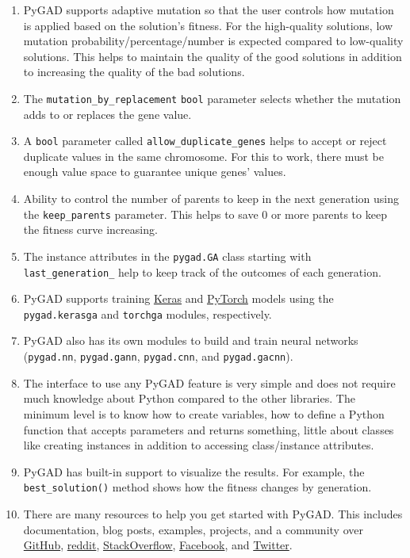 \documentclass[conference]{IEEEtran}
\begin{document}
\begin{enumerate}
  \item PyGAD supports adaptive mutation so that the user controls how mutation is applied based on the solution's fitness. For the high-quality solutions, low mutation probability/percentage/number is expected compared to low-quality solutions. This helps to maintain the quality of the good solutions in addition to increasing the quality of the bad solutions.
  \item The \texttt{mutation\_by\_replacement} \texttt{bool} parameter selects whether the mutation adds to or replaces the gene value.
  \item A \texttt{bool} parameter called \texttt{allow\_duplicate\_genes} helps to accept or reject duplicate values in the same chromosome. For this to work, there must be enough value space to guarantee unique genes' values.
  \item Ability to control the number of parents to keep in the next generation using the \texttt{keep\_parents} parameter. This helps to save 0 or more parents to keep the fitness curve increasing.
  \item The instance attributes in the \texttt{pygad.GA} class starting with \texttt{last\_generation\_} help to keep track of the outcomes of each generation.
  \item PyGAD supports training \href{https://keras.io}{Keras} and \href{https://pytorch.org}{PyTorch} models using the \texttt{pygad.kerasga} and \texttt{torchga} modules, respectively.
  \item PyGAD also has its own modules to build and train neural networks (\texttt{pygad.nn}, \texttt{pygad.gann}, \texttt{pygad.cnn}, and \texttt{pygad.gacnn}).
  \item The interface to use any PyGAD feature is very simple and does not require much knowledge about Python compared to the other libraries. The minimum level is to know how to create variables, how to define a Python function that accepts parameters and returns something, little about classes like creating instances in addition to accessing class/instance attributes.
  \item PyGAD has built-in support to visualize the results. For example, the \texttt{best\_solution()} method shows how the fitness changes by generation.
  \item There are many resources to help you get started with PyGAD. This includes documentation, blog posts, examples, projects, and a community over \href{https://github.com/ahmedfgad/GeneticAlgorithmPython}{GitHub}, \href{https://www.reddit.com/search/?q=PyGAD&sort=relevance}{reddit}, \href{https://stackoverflow.com/search?q=PyGAD}{StackOverflow},  \href{https://www.facebook.com/pygad}{Facebook}, and \href{https://twitter.com/PyGADLib}{Twitter}.
\end{enumerate}
\end{document}
